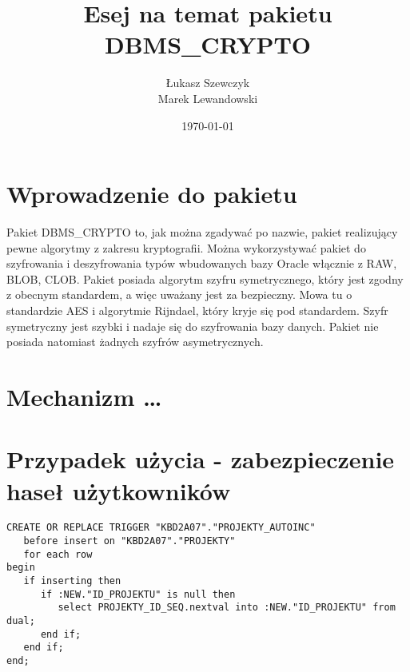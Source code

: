 \documentclass[12pt, a4paper]{article}
\begin{document}
\title{Esej na temat pakietu DBMS\_CRYPTO}
\author{Łukasz Szewczyk\\
		Marek Lewandowski }
\date{\today}



\maketitle


\section{Wprowadzenie do pakietu}
Pakiet DBMS\_CRYPTO to, jak można zgadywać po nazwie, pakiet realizujący pewne
algorytmy z zakresu kryptografii. Można wykorzystywać pakiet do szyfrowania i
deszyfrowania typów wbudowanych bazy Oracle włącznie z RAW, BLOB, CLOB. Pakiet
posiada algorytm szyfru symetrycznego, który jest zgodny z obecnym standardem, a
więc uważany jest za bezpieczny. Mowa tu o standardzie AES i algorytmie
Rijndael, który kryje się pod standardem. Szyfr symetryczny jest szybki i nadaje
się do szyfrowania bazy danych. Pakiet nie posiada natomiast żadnych szyfrów
asymetrycznych.


\section{Mechanizm \ldots}


\section{Przypadek użycia - zabezpieczenie haseł użytkowników}
  
\begin{lstlisting}
CREATE OR REPLACE TRIGGER "KBD2A07"."PROJEKTY_AUTOINC" 
   before insert on "KBD2A07"."PROJEKTY" 
   for each row 
begin  
   if inserting then 
      if :NEW."ID_PROJEKTU" is null then 
         select PROJEKTY_ID_SEQ.nextval into :NEW."ID_PROJEKTU" from dual; 
      end if; 
   end if; 
end;
\end{lstlisting}
  
\end{document}
